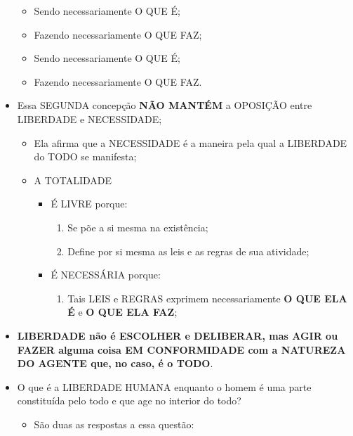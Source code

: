 \documentclass[
]{book}
\providecommand{\tightlist}{%
  \setlength{\itemsep}{0pt}\setlength{\parskip}{0pt}}
\begin{document}
\begin{itemize}
  \begin{itemize}
  \tightlist
  \item
    Sendo necessariamente O QUE É;
  \item
    Fazendo necessariamente O QUE FAZ;
  \item
    Sendo necessariamente O QUE É;
  \item
    Fazendo necessariamente O QUE FAZ.
  \end{itemize}
\item
  Essa SEGUNDA concepção \textbf{NÃO MANTÉM} a OPOSIÇÃO entre LIBERDADE e NECESSIDADE;

  \begin{itemize}
  \tightlist
  \item
    Ela afirma que a NECESSIDADE é a maneira pela qual a LIBERDADE do TODO se manifesta;
  \item
    A TOTALIDADE

    \begin{itemize}
    \tightlist
    \item
      É LIVRE porque:

      \begin{enumerate}
      \def\labelenumi{\alph{enumi}.}
      \tightlist
      \item
        Se põe a si mesma na existência;
      \item
        Define por si mesma as leis e as regras de sua atividade;
      \end{enumerate}
    \item
      É NECESSÁRIA porque:

      \begin{enumerate}
      \def\labelenumi{\alph{enumi}.}
      \tightlist
      \item
        Tais LEIS e REGRAS exprimem necessariamente \textbf{O QUE ELA É} e \textbf{O QUE ELA FAZ};
      \end{enumerate}
    \end{itemize}
  \end{itemize}
\item
  \textbf{LIBERDADE não é ESCOLHER e DELIBERAR, mas AGIR ou FAZER alguma coisa EM CONFORMIDADE com a NATUREZA DO AGENTE que, no caso, é o TODO}.
\item
  O que é a LIBERDADE HUMANA enquanto o homem é uma parte constituída pelo todo e que age no interior do todo?

  \begin{itemize}
  \tightlist
  \item
    São duas as respostas a essa questão:


\end{itemize}
\end{itemize}
\end{document}
